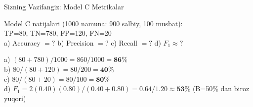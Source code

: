 \documentclass[aspectratio=169,11pt]{beamer}
\begin{document}
\begin{frame}{Sizning Vazifangiz: Model C Metrikalar}
  \begin{tcolorbox}[warnbox,title=Vazifa (4 daqiqa)]
    \small
    Model C natijalari (1000 namuna: 900 salbiy, 100 musbat):\\[4pt]
    TP=80,\; TN=780,\; FP=120,\; FN=20\\[4pt]
    a)\; Accuracy $= ?$\quad
    b)\; Precision $= ?$\quad
    c)\; Recall $= ?$\quad
    d)\; $F_1 \approx ?$
  \end{tcolorbox}
  \pause
  \begin{tcolorbox}[okbox,title=Javob]
    \small
    a)\; $(80+780)/1000=860/1000=\mathbf{86\%}$\\[4pt]
    b)\; $80/(80+120)=80/200=\mathbf{40\%}$\\[4pt]
    c)\; $80/(80+20)=80/100=\mathbf{80\%}$\\[4pt]
    d)\; $F_1=2(0.40)(0.80)/(0.40+0.80)
         =0.64/1.20\approx\mathbf{53\%}$\quad
    \textcolor{halfgray}{\footnotesize (B=50\% dan biroz yuqori)}
  \end{tcolorbox}
\end{frame}
\end{document}
